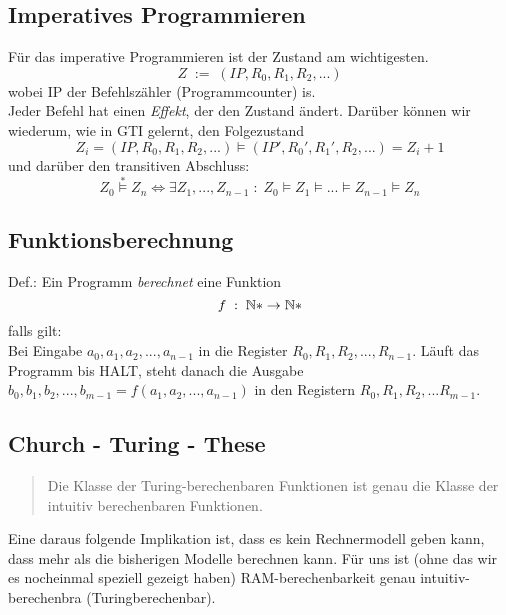 \subsection{Imperatives Programmieren}

Für das imperative Programmieren ist der Zustand am wichtigesten. \\
$$
Z \; := \; (IP, R_0, R_1, R_2,...)
$$
wobei IP der Befehlszähler (Programmcounter) is.\\
Jeder Befehl hat einen \emph{Effekt}, der den Zustand ändert. Darüber können wir wiederum, wie in GTI gelernt, den Folgezustand
$$
Z_i = (IP,R_0,R_1,R_2,...) \models (IP', R_0',R_1',R_2,...) = Z_i+1
$$ 
und darüber den transitiven Abschluss:
$$
Z_0 \overset{*}{\models} Z_n \Leftrightarrow \exists Z_1,...,Z_{n-1} \; : \; Z_0 \models Z_1 \models ... \models Z_{n-1} \models Z_n
$$

\subsection{Funktionsberechnung}

\begin{description}

\item{Def.:} Ein Programm \emph{berechnet} eine Funktion
$$
f \; : \; \mathbb{N} * \rightarrow \mathbb{N} *
$$
falls gilt:\\
Bei Eingabe $a_0, a_1, a_2, ..., a_{n-1}$ in die Register $R_0, R_1, R_2, ..., R_{n-1}$. Läuft das Programm bis HALT, steht danach die Ausgabe $b_0, b_1, b_2 , ..., b_{m-1} = f(a_1, a_2, ..., a_{n-1})$ in den Registern $R_0, R_1, R_2, ... R_{m-1}$.

\subsection{Church - Turing - These}

\begin{quote}
Die Klasse der Turing-berechenbaren Funktionen ist genau die Klasse der intuitiv berechenbaren Funktionen.
\end{quote}

Eine daraus folgende Implikation ist, dass es kein Rechnermodell geben kann, dass mehr als die bisherigen Modelle berechnen kann. Für uns ist (ohne das wir es nocheinmal speziell gezeigt haben) RAM-berechenbarkeit genau intuitiv-berechenbra (Turingberechenbar).

\end{description}

